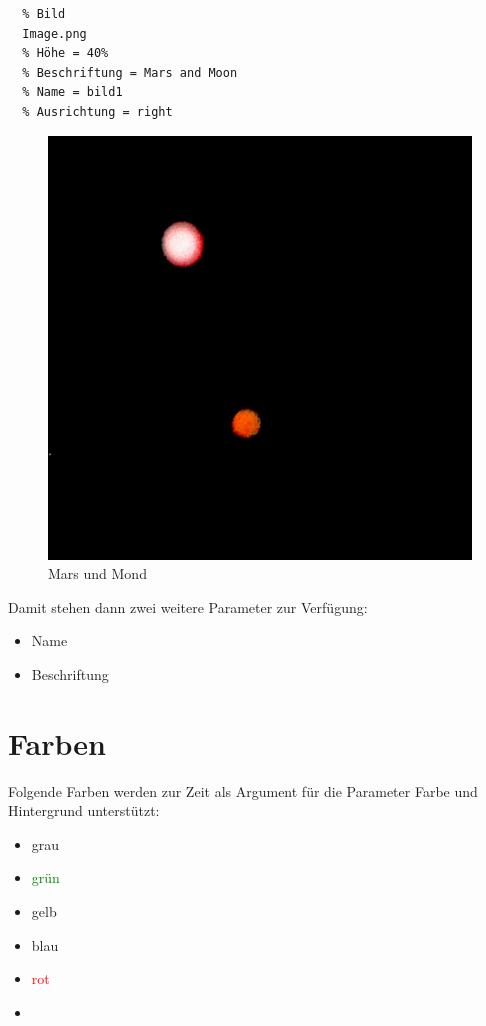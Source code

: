 \documentclass{scrartcl}
\begin{document}
\begin{verbatim}
  % Bild
  Image.png
  % Höhe = 40%
  % Beschriftung = Mars and Moon
  % Name = bild1
  % Ausrichtung = right
\end{verbatim}


\begin{figure}[hbt]
\raggedleft%
\includegraphics[height=.40\textheight]{Image.png}
\caption{Mars und Mond}
\label{bild1}
\end{figure}


{Damit stehen dann zwei weitere Parameter zur Verfügung:\\}

\begin{itemize}
\item Name
\item Beschriftung
\end{itemize}


\section{Farben}

{Folgende Farben werden zur Zeit als Argument für die
Parameter Farbe und Hintergrund unterstützt:\\}

\colorbox{gray!75}{\parbox{\linewidth}{%
\begin{itemize}
\item grau
\item \textcolor{green}{grün}
\item \textcolor{LightYellow1}{gelb}
\item \textcolor{PaleTurquoise1}{blau}
\item \textcolor{red}{rot}
\item \textcolor{white}{weiß}
\end{itemize}

}
}
\end{document}
